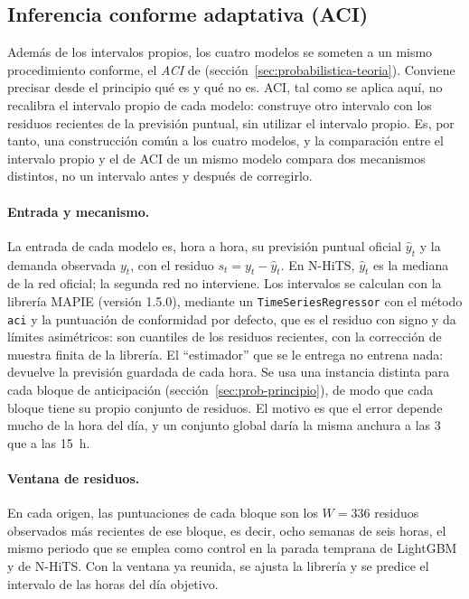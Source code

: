 \subsection{Inferencia conforme adaptativa (ACI)}\label{sec:prob-aci}

Además de los intervalos propios, los cuatro modelos se someten a un mismo
procedimiento conforme, el \emph{ACI} de \textcite{gibbs2021adaptive}
(sección~\ref{sec:probabilistica-teoria}). Conviene precisar desde el
principio qué es y qué no es. ACI, tal como se aplica aquí, no recalibra el
intervalo propio de cada modelo: construye otro intervalo con los residuos
recientes de la previsión puntual, sin utilizar el intervalo propio. Es, por
tanto, una construcción común a los cuatro modelos, y la comparación entre el
intervalo propio y el de ACI de un mismo modelo compara dos mecanismos
distintos, no un intervalo antes y después de corregirlo.

\paragraph{Entrada y mecanismo.} La entrada de cada modelo es, hora a hora, su
previsión puntual oficial $\hat{y}_t$ y la demanda observada $y_t$, con el
residuo $s_t = y_t - \hat{y}_t$. En N-HiTS, $\hat{y}_t$ es la mediana de la
red oficial; la segunda red no interviene. Los intervalos se calculan con la
librería MAPIE (versión 1.5.0), mediante un \texttt{TimeSeriesRegressor} con el
método \texttt{aci} y la puntuación de conformidad por defecto, que es el
residuo con signo y da límites asimétricos: son cuantiles de los residuos
recientes, con la corrección de muestra finita de la librería. El
\enquote{estimador} que se le entrega no entrena nada: devuelve la previsión
guardada de cada hora. Se usa una instancia distinta para cada bloque de
anticipación (sección~\ref{sec:prob-principio}), de modo que cada bloque tiene
su propio conjunto de residuos. El motivo es que el error depende mucho de la
hora del día, y un conjunto global daría la misma anchura a las 3 que a las
15~h.

\paragraph{Ventana de residuos.} En cada origen, las puntuaciones de cada
bloque son los $W = 336$ residuos observados más recientes de ese bloque, es
decir, ocho semanas de seis horas, el mismo periodo que se emplea como control
en la parada temprana de LightGBM y de N-HiTS. Con la ventana ya reunida, se
ajusta la librería y se predice el intervalo de las horas del día objetivo.

